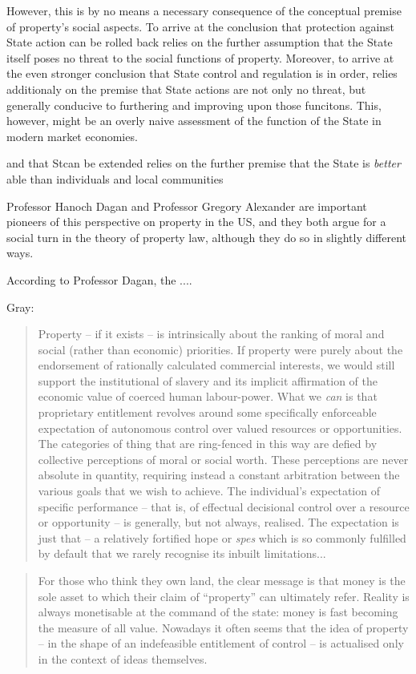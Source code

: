  However, this is by no means a necessary consequence of the conceptual premise of property's social aspects. To arrive at the conclusion that protection against State action can be rolled back relies on the further assumption that the State itself poses no threat to the social functions of property. Moreover, to arrive at the even stronger conclusion that State control and regulation is in order, relies additionaly on the premise that State actions are not only no threat, but generally conducive to furthering and improving upon those funcitons. This, however, might be an overly naive assessment of the function of the State in modern market economies.

 


  and that Stcan be extended relies on the further premise that the State is {\it better} able than individuals and local communities 

Professor Hanoch Dagan and Professor Gregory Alexander are important pioneers of this perspective on property in the US, and they both argue for a social turn in the theory of property law, although they do so in slightly different ways.

According to Professor Dagan, the ....

Gray:

\begin{quote}
Property -- if it exists -- is intrinsically about the ranking of moral and social (rather than economic) priorities. If property were purely about the endorsement of rationally calculated commercial interests, we would still support the institutional of slavery and its implicit affirmation of the economic value of coerced human labour-power. What we {\it can} is that proprietary entitlement revolves around some specifically enforceable expectation of autonomous control over valued resources or opportunities. The categories of thing that are ring-fenced in this way are defied by collective perceptions of moral or social worth. These perceptions are never absolute in quantity, requiring instead a constant arbitration between the various goals that we wish to achieve. The individual's expectation of specific performance -- that is, of effectual decisional control over a resource or opportunity -- is generally, but not always, realised. The expectation is just that -- a relatively fortified hope or {\it spes} which is so commonly fulfilled by default that we rarely recognise its inbuilt limitations...
\end{quote}

\begin{quote}
For those who think they own land, the clear message is that money is the sole asset to which their claim of ``property'' can ultimately refer. Reality is always monetisable at the command of the state: money is fast becoming the measure of all value. Nowadays it often seems that the idea of property -- in the shape of an indefeasible entitlement of control -- is actualised only in the context of ideas themselves.
\end{quote}

